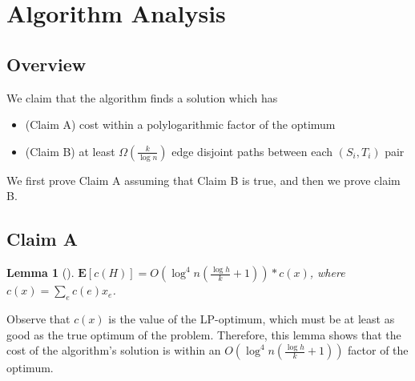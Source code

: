 \documentclass[12pt]{article}
\newtheorem{lemma}{Lemma}
\begin{document}
\section{Algorithm Analysis}

\subsection{Overview}

We claim that the algorithm finds a solution which has
\begin{itemize}
\item (Claim A) cost within a polylogarithmic factor of the optimum
\item (Claim B) at least $\Omega(\frac{k}{\log n})$ edge disjoint paths between each $(S_i, T_i)$ pair
\end{itemize}

We first prove Claim A assuming that Claim B is true, and then we prove claim B.


\subsection{Claim A}

\begin{lemma}[\cite{ssc}]
\label{lem:cost}
$\textbf{E}[c(H)] = O(\log^4n(\frac{\log h}{k}+1)) * c(x)$, where $c(x) = \sum_e c(e)x_e$. 
\end{lemma}

Observe that $c(x)$ is the value of the LP-optimum, which must be at least as good as the true optimum of the problem. Therefore, this lemma shows that the cost of the algorithm's solution is within an $O(\log^4n(\frac{\log h}{k}+1))$ factor of the optimum.
\end{document}
